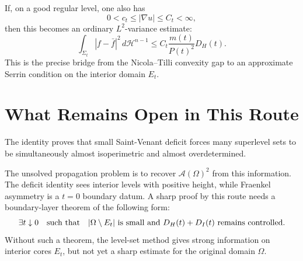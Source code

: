 \documentclass[11pt]{article}
\begin{document}
If, on a good regular level, one also has
\[
0<c_t\le |\nabla u|\le C_t<\infty,
\]
then this becomes an ordinary \(L^2\)-variance estimate:
\[
\int_{\Sigma_t}|f-\bar f|^2\,d\mathcal H^{n-1}
\le
C_t\frac{m(t)}{P(t)^2}D_H(t).
\]
This is the precise bridge from the Nicola--Tilli convexity gap to an
approximate Serrin condition on the interior domain \(E_t\).

\section{What Remains Open in This Route}

The identity proves that small Saint-Venant deficit forces many superlevel sets
to be simultaneously almost isoperimetric and almost overdetermined.

The unsolved propagation problem is to recover \(\mathcal A(\Omega)^2\) from
this information. The deficit identity sees interior levels with positive
height, while Fraenkel asymmetry is a \(t=0\) boundary datum. A sharp proof by
this route needs a boundary-layer theorem of the following form:
\[
\exists t\downarrow0
\quad\hbox{such that}\quad
|\Omega\setminus E_t|
\hbox{ is small and }
D_H(t)+D_I(t)
\hbox{ remains controlled.}
\]
Without such a theorem, the level-set method gives strong information on
interior cores \(E_t\), but not yet a sharp estimate for the original domain
\(\Omega\).
\end{document}
